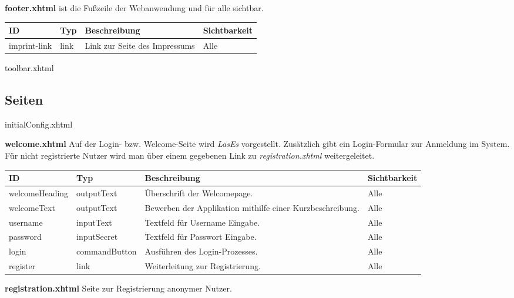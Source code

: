 \textbf{footer.xhtml} ist die Fußzeile der Webanwendung und für alle sichtbar.

\begin{tabular}[H]{|m{2cm}|m{3cm}|m{6cm}|m{2.5cm}|}
	\hline
	\textbf{ID} & \textbf{Typ} & \textbf{Beschreibung} & \textbf{Sichtbarkeit} \\
	\hline
	\hline
	imprint-link & link & Link zur Seite des Impressums & Alle\\
	\hline
\end{tabular}


toolbar.xhtml

\subsection{Seiten}
initialConfig.xhtml

\textbf{welcome.xhtml} Auf der Login- bzw. Welcome-Seite wird \emph{LasEs} vorgestellt.
Zusätzlich gibt ein Login-Formular zur Anmeldung im System.
Für nicht registrierte Nutzer wird man über einem gegebenen Link zu \emph{registration.xhtml} weitergeleitet.


\begin{tabular}[H]{|m{2cm}|m{3cm}|m{6cm}|m{2.5cm}|}
    \hline
    \textbf{ID} & \textbf{Typ} & \textbf{Beschreibung} & \textbf{Sichtbarkeit} \\
    \hline
    \hline
    welcomeHeading & outputText & Überschrift der Welcomepage. & Alle\\
    \hline
    welcomeText & outputText & Bewerben der Applikation mithilfe einer Kurzbeschreibung. & Alle \\
    \hline
    username & inputText & Textfeld für Username Eingabe. & Alle \\
    \hline
    password & inputSecret & Textfeld für Passwort Eingabe. & Alle \\
    \hline
    login & commandButton & Ausführen des Login-Prozesses. & Alle \\
    \hline
    register & link & Weiterleitung zur Registrierung. & Alle \\
    \hline
\end{tabular}

\textbf{registration.xhtml} Seite zur Registrierung anonymer Nutzer.

